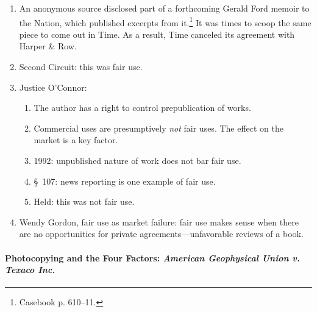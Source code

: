 \begin{enumerate}
    \item An anonymous source disclosed part of a forthcoming Gerald Ford 
    memoir to the Nation, which published excerpts from it.\footnote{Casebook 
    p. 610--11.} It was times to scoop the same piece to come out in Time. As 
    a result, Time canceled its agreement with Harper \& Row.
    \item Second Circuit: this was fair use.
    \item Justice O'Connor:
    \begin{enumerate}
        \item The author has a right to control prepublication of works.
        \item Commercial uses are presumptively \emph{not} fair uses. The 
        effect on the market is a key factor.
        \item 1992: unpublished nature of work does not bar fair use.
        \item \S\ 107: news reporting is one example of fair use.
        \item Held: this was not fair use.
    \end{enumerate}
    \item Wendy Gordon, fair use as market failure: fair use makes sense when 
    there are no opportunities for private agreements---unfavorable reviews of 
    a book.
\end{enumerate}

\paragraph{Photocopying and the Four Factors: \emph{American Geophysical Union 
v. Texaco Inc.}}

